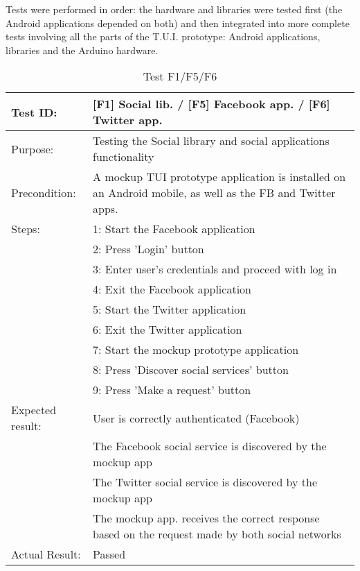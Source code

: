 Tests were performed in order: the hardware and libraries were tested first
(the Android applications depended on both) and then integrated into more
complete tests involving all the parts of the T.U.I. prototype: Android
applications, libraries and the Arduino hardware.


\begin{table}[h!]
\begin{tabular}{|l|p{10cm}|}
\hline Test ID: &		[F1] Social lib. / [F5] Facebook app. / [F6] Twitter app.\\
\hline Purpose: &		Testing the Social library and social applications
						functionality \\
\hline Precondition: &	A mockup TUI prototype application is installed on an
						Android mobile, as well as the FB and Twitter apps. \\
\hline
Steps:
 & 1: Start the Facebook application \\
 & 2: Press 'Login' button \\
 & 3: Enter user's credentials and proceed with log in \\
 & 4: Exit the Facebook application \\
 & 5: Start the Twitter application \\
 & 6: Exit the Twitter application \\
 & 7: Start the mockup prototype application \\
 & 8: Press 'Discover social services' button \\
 & 9: Press 'Make a request' button \\
\hline
Expected result:
 & User is correctly authenticated (Facebook) \\
 & The Facebook social service is discovered by the mockup app \\
 & The Twitter social service is discovered by the mockup app \\
 & The mockup app. receives the correct response based on the request made by
	both social networks \\
\hline
Actual Result:
 & Passed \\
\hline
\end{tabular}
\caption{Test F1/F5/F6}
\end{table}


